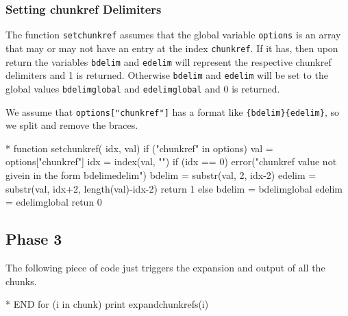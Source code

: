 \documentclass[a4paper]{article} %
\begin{document}
\subsubsection{Setting chunkref Delimiters}

The function \texttt{setchunkref} assumes that the global variable
\texttt{options} is an array that may or may not have an entry at the
index \texttt{chunkref}. If it has, then upon return the variables
\texttt{bdelim} and \texttt{edelim} will represent the respective
chunkref delimiters and 1 is returned. Otherwise \texttt{bdelim} and
\texttt{edelim} will be set to the global values \texttt{bdelimglobal}
and \texttt{edelimglobal} and 0 is returned.

We assume that \verb'options["chunkref"]' has a format like
\verb"{bdelim}{edelim}", so we split and remove the braces.
\begin{chunk}{*}
function setchunkref( idx, val) {
  if ("chunkref" in options) {
    val = options["chunkref"]
    idx = index(val, "}{")
    if (idx == 0) {
      error("chunkref value not givein in the form {bdelim}{edelim}")
    }
    bdelim = substr(val, 2, idx-2)
    edelim = substr(val, idx+2, length(val)-idx-2)
    return 1
  } else {
    bdelim = bdelimglobal
    edelim = edelimglobal
    retun 0
  }
}
\end{chunk}

\subsection{Phase 3}\label{sec:phase3}
The following piece of code just triggers the expansion and output of
all the chunks.
\begin{chunk}{*}
END {
  for (i in chunk) { print expandchunkrefs(i) }
}
\end{chunk}







\end{document}
